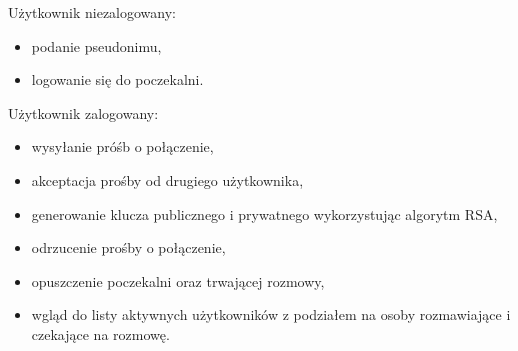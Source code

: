 \noindent Użytkownik niezalogowany: 
\begin{itemize}
\item podanie pseudonimu,
\item logowanie się do poczekalni.
\end{itemize}
Użytkownik zalogowany:
\begin{itemize}
	\item wysyłanie próśb o połączenie,
	\item akceptacja prośby od drugiego użytkownika,
	\item generowanie klucza publicznego i prywatnego wykorzystując algorytm RSA,
	\item odrzucenie prośby o połączenie,
	\item opuszczenie poczekalni oraz trwającej rozmowy,
	\item wgląd do listy aktywnych użytkowników z podziałem na osoby rozmawiające i czekające na rozmowę.
	
	
\end{itemize}
